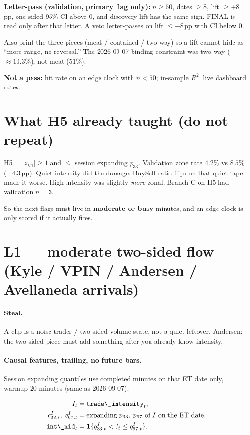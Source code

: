 \documentclass[11pt]{article}
\newcommand{\code}[1]{\texttt{\detokenize{#1}}}
\newcommand{\abs}[1]{\lvert #1 \rvert}
\begin{document}
\textbf{Letter-pass (validation, primary flag only):}
\(n \ge 50\), dates \(\ge 8\), lift \(\ge +8\)\,pp, one-sided 95\% CI
above 0, and discovery lift has the same sign.  FINAL is read only
after that letter.  A veto letter-passes on lift \(\le -8\)\,pp with
CI below 0.

Also print the three pieces (meat / contained / two-way) so a lift
cannot hide as ``more range, no reversal.''  The 2026-09-07 binding
constraint was two-way (\(\approx 10.3\%\)), not meat (\(51\%\)).

\textbf{Not a pass:} hit rate on an edge clock with \(n<50\); in-sample
\(R^2\); live dashboard rates.

\section{What H5 already taught (do not repeat)}

H5 = \(\abs{z_{\mathrm{V1}}}\ge 1\) and
\code{trade\_intensity} \(\le\) session expanding \(p_{33}\).
Validation zone rate \(4.2\%\) vs \(8.5\%\) ($-4.3$\,pp).  Quiet
intensity did the damage.  BuySell-ratio flips on that quiet tape
made it worse.  High intensity was slightly \emph{more} zonal.
Branch C on H5 had validation \(n=3\).

So the next flags must live in \textbf{moderate or busy} minutes, and
an edge clock is only scored if it actually fires.

\section{L1 --- moderate two-sided flow
(Kyle / VPIN / Andersen / Avellaneda arrivals)}

\paragraph{Steal.}
A clip is a noise-trader / two-sided-volume state, not a quiet leftover.
Andersen: the two-sided piece must add something after you already
know intensity.

\paragraph{Causal features, trailing, no future bars.}

Session expanding quantiles use completed minutes on that ET date
only, warmup 20 minutes (same as 2026-09-07).

\begin{align}
I_t &= \code{trade\_intensity}_t, \\
q^{I}_{33,t},\; q^{I}_{67,t}
 &= \text{expanding } p_{33},\; p_{67}\text{ of }I
 \text{ on the ET date}, \\
\text{\code{int\_mid}}_t
 &= \mathbf{1}\{q^{I}_{33,t} < I_t \le q^{I}_{67,t}\}.
\end{align}
\end{document}
